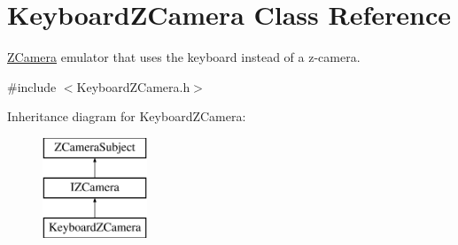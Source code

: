 \hypertarget{classKeyboardZCamera}{
\section{KeyboardZCamera Class Reference}
\label{classKeyboardZCamera}
}


\hyperlink{classZCamera}{ZCamera} emulator that uses the keyboard instead of a z-\/camera.  




{\ttfamily \#include $<$KeyboardZCamera.h$>$}

Inheritance diagram for KeyboardZCamera:\begin{figure}[H]
\begin{center}
\leavevmode
\includegraphics[height=3.000000cm]{classKeyboardZCamera}
\end{center}
\end{figure}
